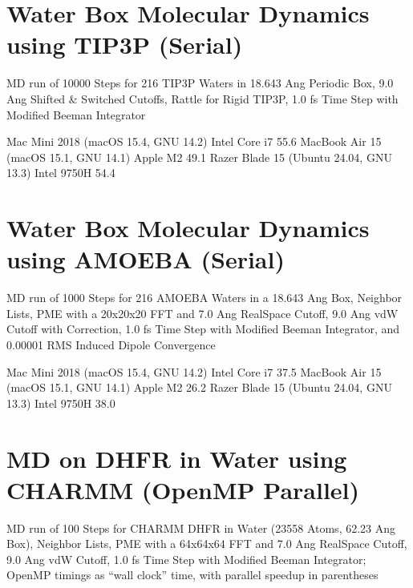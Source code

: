 \documentclass[letterpaper,11pt,english]{sphinxmanual}
\begin{document}
\section{Water Box Molecular Dynamics using TIP3P (Serial)}
\label{\detokenize{text/benchmarks:water-box-molecular-dynamics-using-tip3p-serial}}
\sphinxAtStartPar
MD run of 10000 Steps for 216 TIP3P Waters in 18.643 Ang Periodic Box, 9.0 Ang Shifted \& Switched Cutoffs, Rattle for Rigid TIP3P, 1.0 fs Time Step with Modified Beeman Integrator

\sphinxAtStartPar
{}

\begin{sphinxVerbatim}[commandchars=\\\{\}]
Mac Mini 2018 (macOS 15.4, GNU 14.2)      Intel Core i7            55.6
MacBook Air 15 (macOS 15.1, GNU 14.1)        Apple M2              49.1
Razer Blade 15 (Ubuntu 24.04, GNU 13.3)    Intel 9750H             54.4
\end{sphinxVerbatim}


\section{Water Box Molecular Dynamics using AMOEBA (Serial)}
\label{\detokenize{text/benchmarks:water-box-molecular-dynamics-using-amoeba-serial}}
\sphinxAtStartPar
MD run of 1000 Steps for 216 AMOEBA Waters in a 18.643 Ang Box, Neighbor Lists, PME with a 20x20x20 FFT and 7.0 Ang Real\sphinxhyphen{}Space Cutoff, 9.0 Ang vdW Cutoff with Correction, 1.0 fs Time Step with Modified Beeman Integrator, and 0.00001 RMS Induced Dipole Convergence

\sphinxAtStartPar
{}

\begin{sphinxVerbatim}[commandchars=\\\{\}]
Mac Mini 2018 (macOS 15.4, GNU 14.2)      Intel Core i7            37.5
MacBook Air 15 (macOS 15.1, GNU 14.1)        Apple M2              26.2
Razer Blade 15 (Ubuntu 24.04, GNU 13.3)    Intel 9750H             38.0
\end{sphinxVerbatim}


\section{MD on DHFR in Water using CHARMM (OpenMP Parallel)}
\label{\detokenize{text/benchmarks:md-on-dhfr-in-water-using-charmm-openmp-parallel}}
\sphinxAtStartPar
MD run of 100 Steps for CHARMM DHFR in Water (23558 Atoms, 62.23 Ang Box), Neighbor Lists, PME with a 64x64x64 FFT and 7.0 Ang Real\sphinxhyphen{}Space Cutoff, 9.0 Ang vdW Cutoff, 1.0 fs Time Step with Modified Beeman Integrator; OpenMP timings as “wall clock” time, with parallel speedup in parentheses
\end{document}
